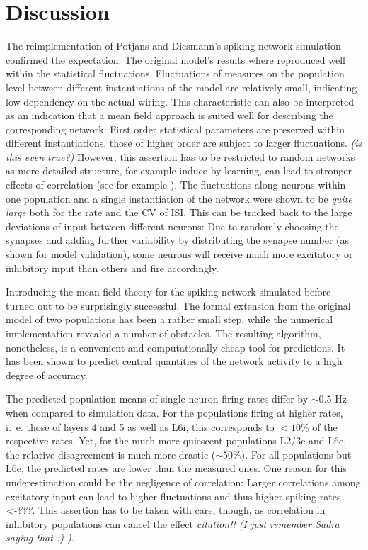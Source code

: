 \section{Discussion}
\label{sec:discussion}

The reimplementation of Potjans and Diesmann's spiking network simulation  
confirmed the expectation: The original model's results where reproduced 
well within the statistical fluctuations. Fluctuations of measures on 
the population level between different instantiations of the model are 
relatively small, indicating low dependency on the actual wiring. 
This characteristic can also be interpreted as an indication that a mean 
field approach is suited well for describing the corresponding network:
First order statistical parameters are preserved within different instantiations, 
those of higher order are subject to larger fluctuations.
\emph{(is this even true?)} However, this assertion has to be restricted to 
random networks as more detailed structure, for example induce by learning, 
can lead to stronger effects of correlation (see for example \cite{staude2010higher}).
The fluctuations along neurons within one population and a single instantiation
of the network were shown to be \emph{quite large} both for the rate and the 
CV of ISI. This can be tracked back to the large deviations of input between 
different neurons: Due to randomly choosing the synapses and adding further 
variability by distributing the synapse number (as shown for model validation), 
some neurons will receive much more excitatory or inhibitory input than others 
and fire accordingly. 

Introducing the mean field theory for the spiking network simulated before 
turned out to be surprisingly successful. 
The formal extension 
from the original model of two populations has been a rather small step, while
the numerical implementation revealed a number of obstacles. The resulting
algorithm, nonetheless, is a convenient and computationally cheap tool for 
predictions. It has been shown to predict central quantities 
of the network activity to a high degree of accuracy.  

The predicted population means of single neuron firing rates differ by 
$\sim 0.5$ Hz when compared to simulation data. For the populations firing at 
higher rates, i.~e. those of layers 4 and 5 as well as L6i, this corresponds 
to $< 10 \%$ of the respective rates. Yet, for the much more quiescent populations 
L2/3e and L6e, the relative disagreement is much more drastic ($\sim 50 \%$). 
For all populations but L6e, the predicted rates are lower than the measured ones.  
One reason for this underestimation could be the negligence of correlation: 
Larger correlations among excitatory input can lead to higher fluctuations 
and thus higher spiking rates~\cite{staude2010higher} \emph{<-???}. This 
assertion has to be taken with care, though, as correlation in inhibitory 
populations can cancel the effect \emph{citation!! (I just remember Sadra saying that :) )}. 

